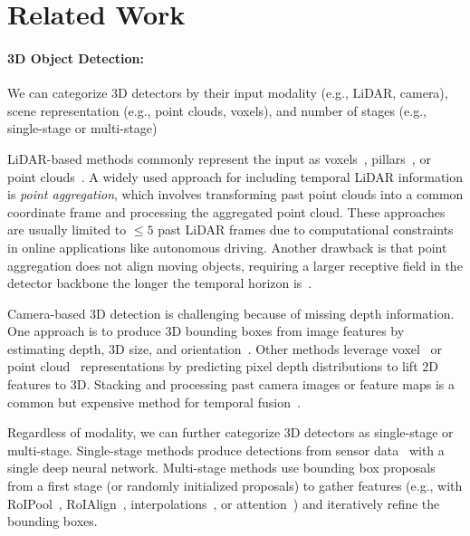 \section{Related Work}
\label{sec:related}

\paragraph{3D Object Detection:}

We can categorize 3D detectors by their input modality (e.g., LiDAR, camera), scene representation (e.g., point clouds, voxels), and number of stages (e.g., single-stage or multi-stage)

LiDAR-based methods commonly represent the input as
voxels~\cite{yan2018second,hednet,safdnet,li20173d,engelcke2017vote3deep,song2016deep}, pillars~\cite{ku2018joint,lang2019pointpillars,simony2018complex,wang2015voting,wang2020pillar,yang2018pixor},
or point clouds~\cite{ngiam2019starnet,wu2024point,shi2019pointrcnn,shi2020point,yang20203dssd}.
A widely used approach for including temporal LiDAR information is \textit{point aggregation}, which involves
transforming past point clouds into a common coordinate frame and processing the aggregated point cloud.
These approaches are usually limited to $\le 5$ past LiDAR frames due to computational constraints~\cite{li2023modar} in online applications like autonomous driving.
Another drawback is that point aggregation does not align moving objects, requiring a larger receptive field in the detector backbone the longer the temporal horizon is~\cite{safdnet,li2023modar}.

Camera-based 3D detection is challenging because of missing depth information.
One approach is to produce 3D bounding boxes from image features
by estimating depth, 3D size, and orientation~\cite{wang2021fcos3d,xu2018multi,chen20153d,mousavian20173d}.
Other methods leverage voxel~\cite{roddick2018orthographic,reading2021categorical,qian2020end} or point cloud~\cite{wang2019pseudo,you2019pseudo} representations
by predicting pixel depth distributions to lift 2D features to 3D.
Stacking and processing past camera images or feature maps
is a common but expensive method for temporal fusion~\cite{zeng2022lift,piergiovanni20214d,hu2021fiery,saha2022translating,can2022understanding}.

Regardless of modality, we can further categorize 3D detectors as single-stage or multi-stage. Single-stage methods produce detections from sensor data~\cite{safdnet,hednet,yan2018second,engelcke2017vote3deep,wang2021fcos3d,chang2024bevmap} with a single deep neural network.
Multi-stage methods use bounding box proposals from a first stage (or randomly initialized proposals)
to gather features (e.g., with RoIPool~\cite{ren2015faster}, RoIAlign~\cite{he2017mask},
interpolations~\cite{centerpoint}, or attention~\cite{zhou2022centerformer,casas2024detra,li2023dfa3d,lin2022sparse4d,wang2022detr3d,liu2022petr,liu2023petrv2})
and iteratively refine the bounding boxes.

